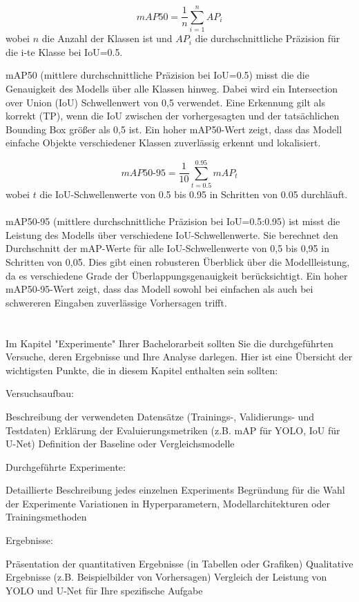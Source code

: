 \[mAP50 = \frac{1}{n} \sum_{i=1}^{n} AP_i\]
wobei $n$ die Anzahl der Klassen ist und $AP_i$ die durchschnittliche Präzision für die i-te Klasse bei IoU=0.5.

mAP50 (mittlere durchschnittliche Präzision bei IoU=0.5) misst die die Genauigkeit des Modells über alle Klassen hinweg. Dabei wird ein Intersection over Union (IoU) Schwellenwert von 0,5 verwendet. Eine Erkennung gilt als korrekt (TP), wenn die IoU zwischen der vorhergesagten und der tatsächlichen Bounding Box größer als 0,5 ist. Ein hoher mAP50-Wert zeigt, dass das Modell einfache Objekte verschiedener Klassen zuverlässig erkennt und lokalisiert.

\[\mathit{mAP50\mbox{-}95} = \frac{1}{10} \sum_{t=0.5}^{0.95} mAP_t\]
wobei $t$ die IoU-Schwellenwerte von 0.5 bis 0.95 in Schritten von 0.05 durchläuft.
\\\\
mAP50-95 (mittlere durchschnittliche Präzision bei IoU=0.5:0.95) ist misst die Leistung des Modells über verschiedene IoU-Schwellenwerte. Sie berechnet den Durchschnitt der mAP-Werte für alle IoU-Schwellenwerte von 0,5 bis 0,95 in Schritten von 0,05. Dies gibt einen robusteren Überblick über die Modellleistung, da es verschiedene Grade der Überlappungsgenauigkeit berücksichtigt. Ein hoher mAP50-95-Wert zeigt, dass das Modell sowohl bei einfachen als auch bei schwereren Eingaben zuverlässige Vorhersagen trifft.
\\\\\\
Im Kapitel "Experimente" Ihrer Bachelorarbeit sollten Sie die durchgeführten Versuche, deren Ergebnisse und Ihre Analyse darlegen. Hier ist eine Übersicht der wichtigsten Punkte, die in diesem Kapitel enthalten sein sollten:

Versuchsaufbau:

Beschreibung der verwendeten Datensätze (Trainings-, Validierungs- und Testdaten)
Erklärung der Evaluierungsmetriken (z.B. mAP für YOLO, IoU für U-Net)
Definition der Baseline oder Vergleichsmodelle


Durchgeführte Experimente:

Detaillierte Beschreibung jedes einzelnen Experiments
Begründung für die Wahl der Experimente
Variationen in Hyperparametern, Modellarchitekturen oder Trainingsmethoden


Ergebnisse:

Präsentation der quantitativen Ergebnisse (in Tabellen oder Grafiken)
Qualitative Ergebnisse (z.B. Beispielbilder von Vorhersagen)
Vergleich der Leistung von YOLO und U-Net für Ihre spezifische Aufgabe


